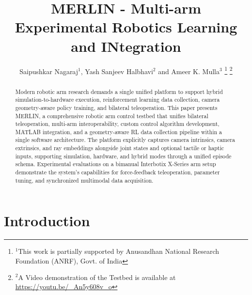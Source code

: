 \documentclass[a4paper, 10pt, conference]{ieeeconf}      %
\title{\LARGE \bf
MERLIN - Multi-arm Experimental Robotics Learning and INtegration
}
\author{Saipushkar Nagaraj$^{1}$, Yash Sanjeev Halbhavi$^{2}$ and Ameer K. Mulla$^{3}$%
\thanks{$^{1}$This work is partially supported by Anusandhan National Research Foundation (ANRF), Govt. of India}%
\thanks{$^{2}$A Video demonstration of the Testbed is available at \url{https://youtu.be/_An5y608v_o}}
}
\begin{document}
\maketitle
\thispagestyle{empty}
\pagestyle{empty}


\begin{abstract}
Modern robotic arm research demands a single unified platform to support hybrid simulation-to-hardware execution, reinforcement learning data collection, camera geometry-aware policy training, and bilateral teleoperation. This paper presents MERLIN, a comprehensive robotic arm control testbed that unifies bilateral teleoperation, multi-arm interoperability, custom control algorithm development, MATLAB integration, and a geometry-aware RL data collection pipeline within a single software architecture. The platform explicitly captures camera intrinsics, camera extrinsics, and ray embeddings alongside joint states and optional tactile or haptic inputs, supporting simulation, hardware, and hybrid modes through a unified episode schema. Experimental evaluations on a bimanual Interbotix X-Series arm setup demonstrate the system's capabilities for force-feedback teleoperation, parameter tuning, and synchronized multimodal data acquisition.

\end{abstract}


\section{Introduction}

\end{document}
